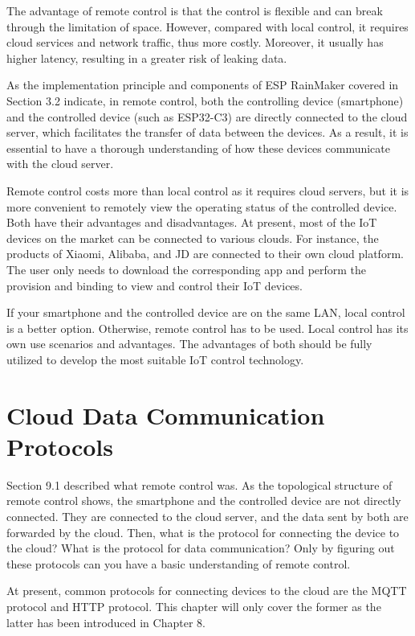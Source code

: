 \documentclass[a4paper,12pt]{book}
\begin{document}
The advantage of remote control is that the control is flexible and can break through the limitation of space. However, compared with local control, it requires cloud services and network traffic, thus more costly. Moreover, it usually has higher latency, resulting in a greater risk of leaking data.

As the implementation principle and components of ESP RainMaker covered in Section 3.2 indicate, in remote control, both the controlling device (smartphone) and the controlled device (such as ESP32-C3) are directly connected to the cloud server, which facilitates the transfer of data between the devices. As a result, it is essential to have a thorough understanding of how these devices communicate with the cloud server.

Remote control costs more than local control as it requires cloud servers, but it is more convenient to remotely view the operating status of the controlled device. Both have their advantages and disadvantages. At present, most of the IoT devices on the market can be connected to various clouds. For instance, the products of Xiaomi, Alibaba, and JD are connected to their own cloud platform. The user only needs to download the corresponding app and perform the provision and binding to view and control their IoT devices.

If your smartphone and the controlled device are on the same LAN, local control is a better option. Otherwise, remote control has to be used. Local control has its own use scenarios and advantages. The advantages of both should be fully utilized to develop the most suitable IoT control technology.

\section{Cloud Data Communication Protocols}
Section 9.1 described what remote control was. As the topological structure of remote control shows, the smartphone and the controlled device are not directly connected. They are connected to the cloud server, and the data sent by both are forwarded by the cloud. Then, what is the protocol for connecting the device to the cloud? What is the protocol for data communication? Only by figuring out these protocols can you have a basic understanding of remote control.

At present, common protocols for connecting devices to the cloud are the MQTT protocol and HTTP protocol. This chapter will only cover the former as the latter has been introduced in Chapter 8.
\end{document}
